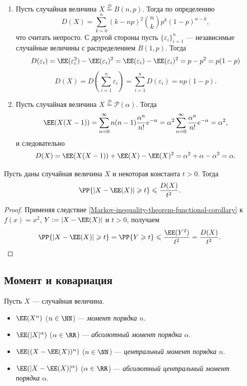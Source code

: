 \documentclass[12pt,a4paper]{article}
\newcommand{\Deq}{\mathrel{\stackrel{\mathcal{D}}{=}}}
\begin{document}
    \begin{example}\ 
        \begin{enumerate}
            \item Пусть случайная величина $X \Deq B(n, p)$. Тогда по определению
                \[D(X) = \sum_{k=0}^n (k-np)^2 \binom{n}{k} p^k (1-p)^{n-k},\]
                что считать непросто. С другой стороны пусть $\{\varepsilon_i\}_{i=1}^n$ --- независимые случайные величины с распределением $B(1, p)$. Тогда
                \[
                    D(\varepsilon_i)
                    = \EE(\varepsilon_i^2) - \EE(\varepsilon_i)^2
                    = \EE(\varepsilon_i) - \EE(\varepsilon_i)^2
                    = p - p^2
                    = p(1-p)
                \]
                \[
                    D(X)
                    = D\left(\sum_{i=1}^n \varepsilon_i\right)
                    = \sum_{i=1}^n D(\varepsilon_i)
                    = np(1-p).
                \]
            \item Пусть случайная величина $X \Deq \mathcal{P}(\alpha)$. Тогда
                \[\EE(X(X-1)) = \sum_{n=0}^\infty n(n-1) \frac{\alpha^n}{n!} e^{-\alpha} = \alpha^2 \sum_{n=0}^\infty \frac{\alpha^n}{n!} e^{-\alpha} = \alpha^2,\]
                и следовательно
                \[D(X) = \EE(X(X-1)) + \EE(X) - \EE(X)^2 = \alpha^2 + \alpha - \alpha^2 = \alpha.\]
        \end{enumerate}
    \end{example}

    \begin{theorem}
        Пусть даны случайная величина $X$ и некоторая константа $t > 0$. Тогда
        \[\PP\{|X - \EE(X)| \geqslant t\} \leqslant \frac{D(X)}{t^2}.\]
    \end{theorem}

    \begin{proof}
        Применяя следствие \ref{Markov-inequality-theorem-functional-corollary} к $f(x) = x^2$, $Y := |X - \EE(X)|$ и $t > 0$, получаем
        \[\PP\{|X - \EE(X)| \geqslant t\} = \PP\{Y \geqslant t\} \leqslant \frac{\EE(Y^2)}{t^2} = \frac{D(X)}{t^2}.\]
    \end{proof}

    \subsection{Момент и ковариация}

    \begin{definition}
        Пусть $X$ --- случайная величина.
        \begin{itemize}
            \item $\EE(X^n)$ ($n \in \NN$) --- \emph{момент порядка $n$}.
            \item $\EE(|X|^\alpha)$ ($\alpha \in \RR$) --- \emph{абсолютный момент порядка $\alpha$}.
            \item $\EE((X - \EE(X))^n)$ ($n \in \NN$) --- \emph{центральный момент порядка $n$}.
            \item $\EE(|X - \EE(X)|^\alpha)$ ($\alpha \in \RR$) --- \emph{абсолютный центральный момент порядка $\alpha$}.
        \end{itemize}
    \end{definition}
\end{document}
